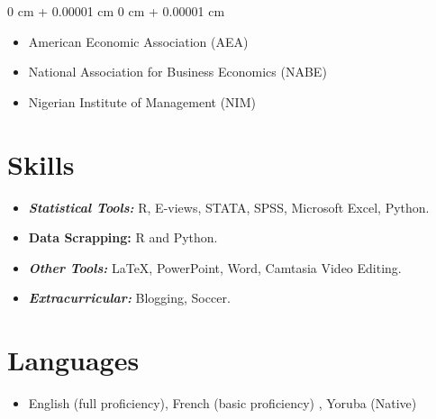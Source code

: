 \documentclass[10pt, letterpaper]{article}
\newenvironment{onecolentry}{
    \begin{adjustwidth}{
        0 cm + 0.00001 cm
    }{
        0 cm + 0.00001 cm
    }
}{
    \end{adjustwidth}
} %
\begin{document}
        \begin{onecolentry}
            \begin{itemize}
                \item American Economic Association (AEA)
                \item National Association for Business Economics (NABE)
                \item Nigerian Institute of Management (NIM) 
            \end{itemize}
        \end{onecolentry}

        
            \section{Skills}
        
        \begin{itemize}
            \item \textbf{\textit{Statistical Tools:}} R, E-views, STATA, SPSS, Microsoft Excel, Python.
            \item \textbf{Data Scrapping:} R and Python. 
            \item \textbf{\textit{Other Tools:}} LaTeX, PowerPoint, Word, Camtasia Video Editing. 
            \item \textit{\textbf{Extracurricular:}} Blogging, Soccer. 

        \end{itemize}

            \section{Languages}

     \begin{itemize}
         \item English (full proficiency), French (basic proficiency) , Yoruba (Native)

     \end{itemize}

        \vspace{0.2 cm}
\end{document}
